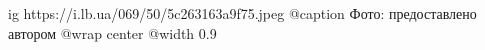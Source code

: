 
 
 
 
 

\ifcmt
  ig https://i.lb.ua/069/50/5c263163a9f75.jpeg
	@caption Фото: предоставлено автором
  @wrap center
  @width 0.9
\fi

